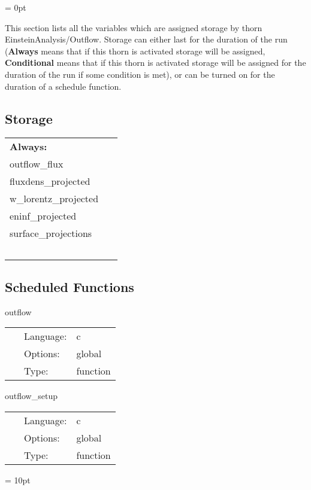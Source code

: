 \parskip = 0pt


\noindent This section lists all the variables which are assigned storage by thorn EinsteinAnalysis/Outflow.  Storage can either last for the duration of the run ({\bf Always} means that if this thorn is activated storage will be assigned, {\bf Conditional} means that if this thorn is activated storage will be assigned for the duration of the run if some condition is met), or can be turned on for the duration of a schedule function.


\subsection*{Storage}

\hspace{5mm}

 \begin{tabular*}{160mm}{ll} 

{\bf Always:}&  ~ \\ 
 outflow\_flux & ~\\ 
 fluxdens\_projected & ~\\ 
 w\_lorentz\_projected & ~\\ 
 eninf\_projected & ~\\ 
 surface\_projections & ~\\ 
~ & ~\\ 
\end{tabular*} 


\subsection*{Scheduled Functions}
\vspace{5mm}


\hspace{5mm} outflow 

\hspace{5mm}{\it compute outflow } 


\hspace{5mm}

 \begin{tabular*}{160mm}{cll} 
~ & Language:  & c \\ 
~ & Options:  & global \\ 
~ & Type:  & function \\ 
\end{tabular*} 


\vspace{5mm}


\hspace{5mm} outflow\_setup 

\hspace{5mm}{\it set up global ompute data structures } 


\hspace{5mm}

 \begin{tabular*}{160mm}{cll} 
~ & Language:  & c \\ 
~ & Options:  & global \\ 
~ & Type:  & function \\ 
\end{tabular*} 



\vspace{5mm}\parskip = 10pt 

